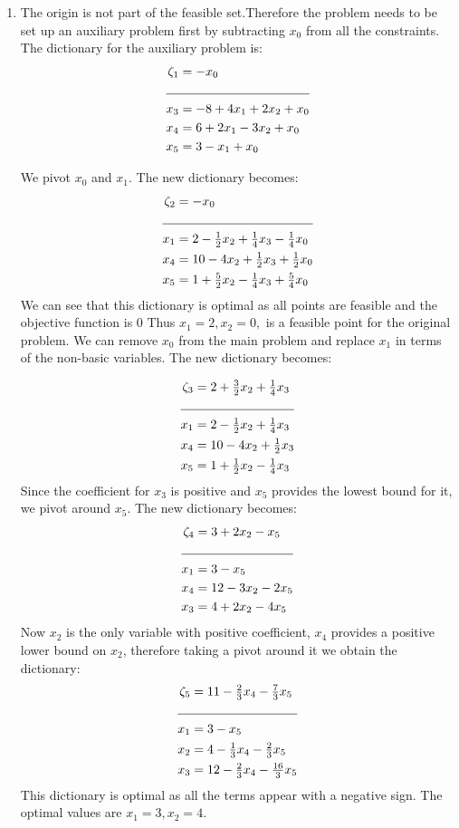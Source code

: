 \documentclass[letterpaper,12pt]{article}
\theoremstyle{definition}
\begin{document}
\begin{enumerate}
  \item The origin is not part of the feasible set.Therefore the problem needs to be set up an auxiliary problem first by subtracting $x_0$ from all the
  constraints. The dictionary for the auxiliary problem is:
  \begin{align*}
    \zeta_1 &= -x_0\\
    \cline{1-2}
    x_3 &= -8 + 4x_1 + 2x_2 + x_0\\
    x_4 &= 6 + 2x_1 -3x_2+ x_0\\
    x_5 &= 3-x_1+x_0
  \end{align*}

  We pivot $x_0$ and $x_1$. The new dictionary becomes:
  \begin{align*}
    \zeta_2 &= -x_0\\
    \cline{1-2}
    x_1 &= 2 - \tfrac{1}{2}x_2 + \tfrac{1}{4}x_3-\tfrac{1}{4}x_0\\
    x_4 &= 10 - 4x_2 +\tfrac{1}{2}x_3+ \tfrac{1}{2}x_0\\
    x_5 &= 1+\tfrac{5}{2}x_2 - \tfrac{1}{4}x_3 + \tfrac{5}{4}x_0\\
  \end{align*}
  We can see that this dictionary is optimal as all points are feasible and the objective function is 0
  Thus $x_1=2, x_2=0, $ is a feasible point for the original problem. We can remove $x_0$ from the main problem
  and replace $x_1$ in terms of the non-basic variables. The new dictionary becomes:

  \begin{align*}
    \zeta_3 &= 2 + \tfrac{3}{2}x_2+\tfrac{1}{4}x_3\\
    \cline{1-2}
    x_1 &= 2 - \tfrac{1}{2}x_2 + \tfrac{1}{4}x_3\\
    x_4 &= 10 - 4x_2 +\tfrac{1}{2}x_3\\
    x_5 &= 1 + \tfrac{1}{2}x_2 - \tfrac{1}{4}x_3\\
  \end{align*}
  Since the coefficient for  $x_3$ is positive and $x_5$ provides the lowest bound for it, we pivot around $x_5$. The new dictionary becomes:
  \begin{align*}
    \zeta_4 &= 3+2x_2-x_5\\
    \cline{1-2}
    x_1 &= 3 - x_5\\
    x_4 &=12-3x_2-2x_5\\
    x_3 &= 4+2x_2-4x_5\\
  \end{align*}
Now $x_2$ is the only variable with positive coefficient, $x_4$ provides a positive lower bound on $x_2$, therefore taking a pivot around it we  obtain the dictionary:
\begin{align*}
  \zeta_5 &= 11- \tfrac{2}{3}x_4- \tfrac{7}{3}x_5\\
  \cline{1-2}
  x_1 &= 3-x_5\\
  x_2 &= 4 - \tfrac{1}{3}x_4 - \tfrac{2}{3}x_5\\
  x_3 &= 12 - \tfrac{2}{3}x_4 - \tfrac{16}{3}x_5
\end{align*}
This dictionary is optimal as all the terms appear with a negative sign. The optimal values are $x_1=3, x_2=4$.


\end{enumerate}
\end{document}
